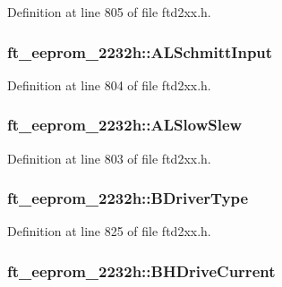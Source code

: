 Definition at line 805 of file ftd2xx.h.\hypertarget{structft__eeprom__2232h_aabf6af90bb51868803bb93b09f45d6fd}{
\subsubsection[{ALSchmittInput}]{ {\bf ft\_\-eeprom\_\-2232h::ALSchmittInput}}}
\label{structft__eeprom__2232h_aabf6af90bb51868803bb93b09f45d6fd}


Definition at line 804 of file ftd2xx.h.\hypertarget{structft__eeprom__2232h_a202255f5052272a7807e17fd5d580438}{
\subsubsection[{ALSlowSlew}]{ {\bf ft\_\-eeprom\_\-2232h::ALSlowSlew}}}
\label{structft__eeprom__2232h_a202255f5052272a7807e17fd5d580438}


Definition at line 803 of file ftd2xx.h.\hypertarget{structft__eeprom__2232h_a9a4775d141f2b01fc4d846cb3cd23368}{
\subsubsection[{BDriverType}]{ {\bf ft\_\-eeprom\_\-2232h::BDriverType}}}
\label{structft__eeprom__2232h_a9a4775d141f2b01fc4d846cb3cd23368}


Definition at line 825 of file ftd2xx.h.\hypertarget{structft__eeprom__2232h_a3a1abb3b2944000c21b54ce123913c5f}{
\subsubsection[{BHDriveCurrent}]{ {\bf ft\_\-eeprom\_\-2232h::BHDriveCurrent}}}
\label{structft__eeprom__2232h_a3a1abb3b2944000c21b54ce123913c5f}


